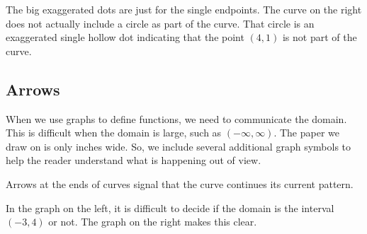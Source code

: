 \documentclass{ximera}
\begin{document}
The big exaggerated dots are just for the single endpoints.  The curve on the right does not actually include a circle as part of the curve. That circle is an exaggerated single hollow dot indicating that the point $(4, 1)$ is not part of the curve.














\subsection*{Arrows}


When we use graphs to define functions, we need to communicate the domain. This is difficult when the domain is large, such as $(-\infty, \infty)$. The paper we draw on is only inches wide.  So, we include several additional graph symbols to help the reader understand what is happening out of view.

Arrows at the ends of curves signal that the curve continues its current pattern.


In the graph on the left, it is difficult to decide if the domain is the interval $(-3, 4)$ or not.  The graph on the right makes this clear.

\begin{image}
\end{image}
\end{document}
